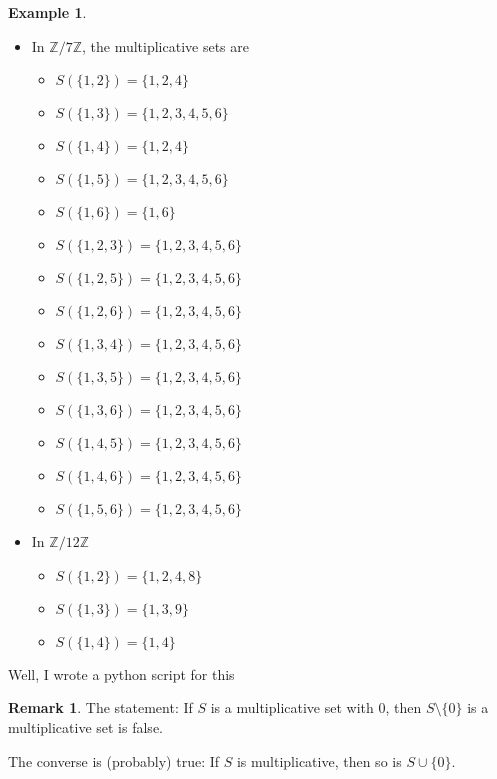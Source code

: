 \documentclass[a4paper]{book}
\theoremstyle{definition}
\newtheorem{example}{Example}[definition]
\newtheorem*{remark}{Remark}
\begin{document}
\begin{example}
\begin{itemize}
        \item In \(\mathbb{Z} / 7 \mathbb{Z}\), the multiplicative sets are
        \begin{itemize}
            \item \(S(\{1, 2\}) = \{1, 2, 4\}\)
            \item \(S(\{1, 3\}) = \{1, 2, 3, 4, 5, 6\}\)
            \item \(S(\{1, 4\}) = \{1, 2, 4\}\)
            \item \(S(\{1, 5\}) = \{1, 2, 3, 4, 5, 6\}\)
            \item \(S(\{1, 6\}) = \{1, 6\}\)
            \item \(S(\{1, 2, 3\}) = \{1, 2, 3, 4, 5, 6\}\)
            \item \(S(\{1, 2, 5\}) = \{1, 2, 3, 4, 5, 6\}\)
            \item \(S(\{1, 2, 6\}) = \{1, 2, 3, 4, 5, 6\}\)
            \item \(S(\{1, 3, 4\}) = \{1, 2, 3, 4, 5, 6\}\)
            \item \(S(\{1, 3, 5\}) = \{1, 2, 3, 4, 5, 6\}\)
            \item \(S(\{1, 3, 6\}) = \{1, 2, 3, 4, 5, 6\}\)
            \item \(S(\{1, 4, 5\}) = \{1, 2, 3, 4, 5, 6\}\)
            \item \(S(\{1, 4, 6\}) = \{1, 2, 3, 4, 5, 6\}\)
            \item \(S(\{1, 5, 6\}) = \{1, 2, 3, 4, 5, 6\}\)
        \end{itemize}

        \item In \(\mathbb{Z} / 12 \mathbb{Z}\)
        \begin{itemize}
            \item \(S(\{1, 2\}) = \{1, 2, 4, 8\}\)
            \item \(S(\{1, 3\}) = \{1, 3, 9\}\)
            \item \(S(\{1, 4\}) = \{1, 4\}\)
        \end{itemize}
    \end{itemize}
\end{example}

Well, I wrote a python script for this

\begin{rembox}
    \begin{remark}
        The statement: If \(S\) is a multiplicative set with \(0\), then \(S \setminus \{0\}\) is a multiplicative set is false.

        The converse is (probably) true: If \(S\) is multiplicative, then so is \(S \cup \{0\}\).
    \end{remark}
\end{rembox}
\end{document}
